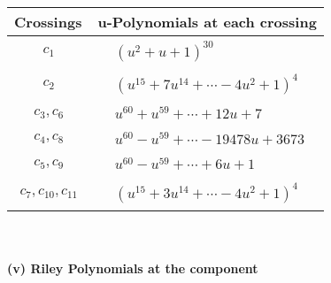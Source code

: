 \documentclass[1p]{elsarticle_modified}
\theoremstyle{definition}
\begin{document}
\begin{tabular}{m{50pt}|m{274pt}}
Crossings & \hspace{64pt}u-Polynomials at each crossing \\
\hline $$\begin{aligned}c_{1}\end{aligned}$$&$\begin{aligned}
&(u^2+u+1)^{30}
\end{aligned}$\\
\hline $$\begin{aligned}c_{2}\end{aligned}$$&$\begin{aligned}
&(u^{15}+7 u^{14}+\cdots-4 u^2+1)^{4}
\end{aligned}$\\
\hline $$\begin{aligned}c_{3},c_{6}\end{aligned}$$&$\begin{aligned}
&u^{60}+u^{59}+\cdots+12 u+7
\end{aligned}$\\
\hline $$\begin{aligned}c_{4},c_{8}\end{aligned}$$&$\begin{aligned}
&u^{60}- u^{59}+\cdots-19478 u+3673
\end{aligned}$\\
\hline $$\begin{aligned}c_{5},c_{9}\end{aligned}$$&$\begin{aligned}
&u^{60}- u^{59}+\cdots+6 u+1
\end{aligned}$\\
\hline $$\begin{aligned}c_{7},c_{10},c_{11}\end{aligned}$$&$\begin{aligned}
&(u^{15}+3 u^{14}+\cdots-4 u^2+1)^{4}
\end{aligned}$\\
\hline
\end{tabular}\\~\\
\newpage\renewcommand{\arraystretch}{1}
\flushleft \textbf{(v) Riley Polynomials at the component}\newline \\
\end{document}
